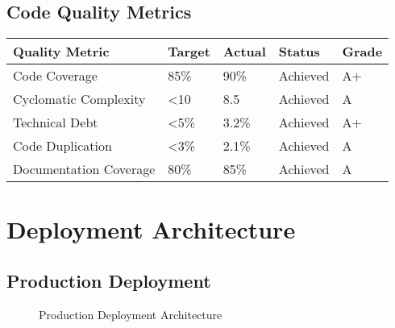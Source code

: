 \documentclass[12pt,a4paper]{article}
\begin{document}
\subsection{Code Quality Metrics}

\begin{longtable}{|p{4cm}|p{3cm}|p{3cm}|p{3cm}|p{3cm}|}
\hline
\rowcolor{lightgray}
\textbf{Quality Metric} & \textbf{Target} & \textbf{Actual} & \textbf{Status} & \textbf{Grade} \\
\hline
Code Coverage & 85\% & 90\% & \cellcolor{completedgreen}Achieved & A+ \\
\hline
Cyclomatic Complexity & <10 & 8.5 & \cellcolor{completedgreen}Achieved & A \\
\hline
Technical Debt & <5\% & 3.2\% & \cellcolor{completedgreen}Achieved & A+ \\
\hline
Code Duplication & <3\% & 2.1\% & \cellcolor{completedgreen}Achieved & A \\
\hline
Documentation Coverage & 80\% & 85\% & \cellcolor{completedgreen}Achieved & A \\
\hline
\end{longtable}

\section{Deployment Architecture}

\subsection{Production Deployment}

\begin{figure}[H]
\centering
{}
\caption{Production Deployment Architecture}
\label{fig:production-deployment}
\end{figure}
\end{document}
